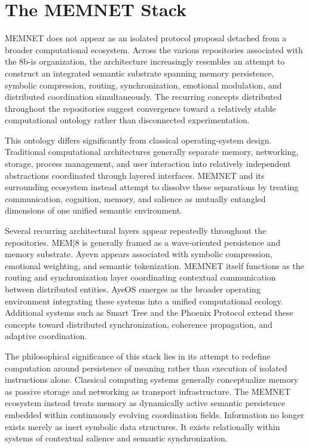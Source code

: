 \documentclass[11pt,a4paper]{article}
\begin{document}
\section{The MEMNET Stack}

MEMNET does not appear as an isolated protocol proposal detached from a broader computational ecosystem. Across the various repositories associated with the 8b-is organization, the architecture increasingly resembles an attempt to construct an integrated semantic substrate spanning memory persistence, symbolic compression, routing, synchronization, emotional modulation, and distributed coordination simultaneously. The recurring concepts distributed throughout the repositories suggest convergence toward a relatively stable computational ontology rather than disconnected experimentation.

This ontology differs significantly from classical operating-system design. Traditional computational architectures generally separate memory, networking, storage, process management, and user interaction into relatively independent abstractions coordinated through layered interfaces. MEMNET and its surrounding ecosystem instead attempt to dissolve these separations by treating communication, cognition, memory, and salience as mutually entangled dimensions of one unified semantic environment.

Several recurring architectural layers appear repeatedly throughout the repositories. MEM|8 is generally framed as a wave-oriented persistence and memory substrate. Ayevn appears associated with symbolic compression, emotional weighting, and semantic tokenization. MEMNET itself functions as the routing and synchronization layer coordinating contextual communication between distributed entities. AyeOS emerges as the broader operating environment integrating these systems into a unified computational ecology. Additional systems such as Smart Tree and the Phoenix Protocol extend these concepts toward distributed synchronization, coherence propagation, and adaptive coordination.

The philosophical significance of this stack lies in its attempt to redefine computation around persistence of meaning rather than execution of isolated instructions alone. Classical computing systems generally conceptualize memory as passive storage and networking as transport infrastructure. The MEMNET ecosystem instead treats memory as dynamically active semantic persistence embedded within continuously evolving coordination fields. Information no longer exists merely as inert symbolic data structures. It exists relationally within systems of contextual salience and semantic synchronization.
\end{document}
